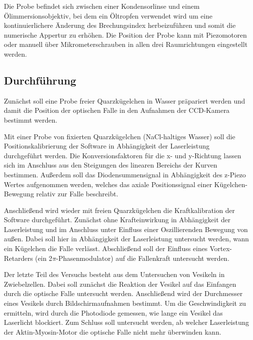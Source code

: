 Die Probe befindet sich zwischen einer Kondensorlinse und einem Ölimmersionsobjektiv, bei dem ein 
Öltropfen verwendet wird um eine kontinuierlichere Änderung des Brechungsindex herbeizuführen und somit die numerische Appertur zu erhöhen.
Die Position der Probe kann mit Piezomotoren oder manuell über Mikrometerschrauben in allen drei Raumrichtungen eingestellt werden.

\subsection{Durchführung}
Zunächst soll eine Probe freier Quarzkügelchen in Wasser präpariert werden
und damit die Position der optischen Falle in den Aufnahmen der CCD-Kamera
bestimmt werden.

Mit einer Probe von fixierten Quarzkügelchen (NaCl-haltiges Wasser)
soll die Positionskalibrierung der Software in Abhängigkeit der 
Laserleistung durchgeführt werden. Die Konversionsfaktoren für die x- und y-Richtung lassen 
sich im Anschluss aus den Steigungen des linearen Bereichs der Kurven bestimmen. Außerdem soll das Diodensummensignal in Abhängigkeit des z-Piezo Wertes 
aufgenommen werden, welches das axiale Positionssignal einer Kügelchen-Bewegung relativ zur Falle beschreibt.

Anschließend wird wieder mit freien Quarzkügelchen die Kraftkalibration der Software durchgeführt.
Zunächst ohne Krafteinwirkung in Abhängigkeit der Laserleistung und im Anschluss unter Einfluss einer Oszillierenden Bewegung von außen.
Dabei soll hier in Abhängigkeit der Laserleistung untersucht werden, wann ein Kügelchen die Falle verlässt.
Abschließend soll der Einfluss eines Vortex-Retarders (ein 2$\pi$-Phasenmodulator) auf die Fallenkraft untersucht werden.

Der letzte Teil des Versuchs besteht aus dem Untersuchen von Vesikeln in Zwiebelzellen.
Dabei soll zunächst die Reaktion der Vesikel auf das Einfangen durch die optische Falle untersucht werden.
Anschließend wird der Durchmesser eines Vesikels durch Bildschirmaufnahmen bestimmt. 
Um die Geschwindigkeit zu ermitteln, wird durch die Photodiode gemessen, wie lange ein Vesikel das Laserlicht blockiert.
Zum Schluss soll untersucht werden, ab welcher Laserleistung der Aktin-Myosin-Motor die optische Falle nicht mehr überwinden kann.